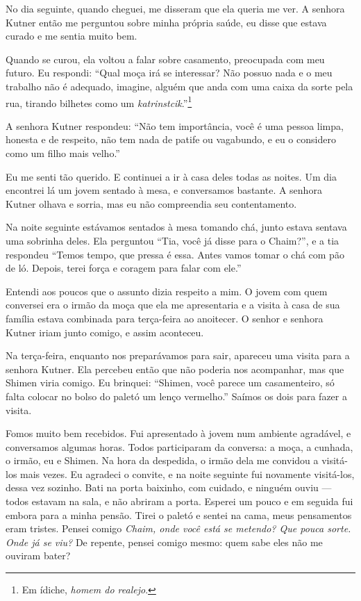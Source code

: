 No dia seguinte, quando cheguei, me disseram que 
ela queria me ver. A senhora Kutner então me perguntou sobre
minha própria saúde, eu disse que estava curado e me sentia muito bem.

Quando se curou, ela voltou a falar sobre casamento,
preocupada com meu futuro. Eu respondi: ``Qual moça irá se
interessar? Não possuo nada e o meu trabalho não é adequado, imagine,
alguém que anda com uma caixa da sorte pela rua, tirando bilhetes como
um \textit{katrinstcik}.''\footnote{Em ídiche, \textit{homem do realejo}.}

A senhora Kutner respondeu: ``Não tem importância, você é uma pessoa
limpa, honesta e de respeito, não tem nada de patife ou vagabundo, e eu o
considero como um filho mais velho.''

Eu me senti tão querido. E continuei a ir à casa deles todas as noites.
Um dia encontrei lá um jovem sentado à mesa, e conversamos bastante. A
senhora Kutner olhava e sorria, mas eu não compreendia seu contentamento.

Na noite seguinte estávamos sentados à mesa tomando chá, junto estava
sentava uma sobrinha deles. Ela perguntou ``Tia, você já disse para o
Chaim?'', e a tia respondeu ``Temos tempo, que pressa é essa.
Antes vamos tomar o chá com pão de ló. Depois, terei força e coragem para
falar com ele.''

Entendi aos poucos que o assunto dizia respeito a mim. O jovem com quem conversei
era o irmão da moça que ela me apresentaria e a visita à casa de sua família
estava combinada para terça-feira ao anoitecer. O senhor e senhora Kutner iriam junto
comigo, e assim aconteceu.

Na terça-feira, enquanto nos preparávamos para sair, apareceu uma visita para a
senhora Kutner. Ela percebeu então que não poderia nos acompanhar, mas
que Shimen viria comigo. Eu brinquei: ``Shimen, você
parece um casamenteiro, só falta colocar no bolso do paletó um lenço
vermelho.'' Saímos os dois para fazer a visita.

Fomos muito bem recebidos. Fui apresentado à jovem num ambiente
agradável, e conversamos algumas horas. Todos participaram da conversa: a
moça, a cunhada, o irmão, eu e Shimen. Na hora da despedida, o irmão
dela me convidou a visitá-los mais vezes. Eu agradeci o convite, e na noite 
seguinte fui novamente visitá-los, dessa vez sozinho. Bati
na porta baixinho, com cuidado, e ninguém ouviu --- todos
estavam na sala, e não abriram a porta. Esperei um pouco e em seguida fui embora
para a minha pensão. Tirei o paletó e sentei na cama, meus pensamentos eram tristes. 
Pensei comigo \textit{Chaim, onde você está se
metendo? Que pouca sorte. Onde já se viu?} De repente, pensei comigo mesmo: 
quem sabe eles não me ouviram bater?

